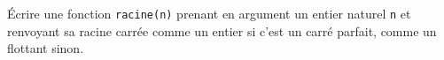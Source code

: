 \exer{}
\setcounter{numques}{0}

\question{} \'Ecrire une fonction \texttt{racine(n)} prenant en argument un entier naturel \texttt{n} et renvoyant sa racine carrée comme un entier si c'est un carré parfait, comme un flottant sinon.